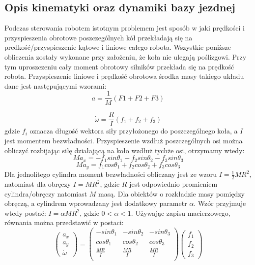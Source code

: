 \subsection{Opis kinematyki oraz dynamiki bazy jezdnej}
Podczas sterowania robotem istotnym problemem jest sposób w jaki prędkości i przyspieszenia obrotowe poszczególnych kół przekładają się
na predkość/przyspieszenie kątowe i liniowe całego robota. Wszystkie poniższe obliczenia zostały wykonane przy założeniu, że koła nie ulegają poślizgowi.
Przy tym uproszczeniu cały moment obrotowy silników przekłada się na prędkość robota.
Przyspieszenie liniowe i prędkość obrotowa środka masy takiego układu dane jest następującymi wzorami:
\begin{equation}
a=\frac{1}{M}(F1+F2+F3)
\end{equation}

\begin{equation}
\dot{ \omega }=\frac{R}{I}(f_1+f_2+f_3)
\end{equation}
gdzie $f_i$ oznacza długość wektora siły przyłożonego do poszczególnego koła, a $I$  jest momentem bezwładności.
Przyspieszenie wzdłuż poszczególnych osi można obliczyć rozbijając siłę działającą na koło wzdłuż tychże osi, otrzymamy wtedy:
\begin{equation}
Ma_x=-f_1sin\theta_1 - f_2sin\theta_2 - f_3sin\theta_3
\end{equation}
\begin{equation}
Ma_y=f_1cos\theta_1 + f_2cos\theta_2 + f_3cos\theta_3
\end{equation}
Dla jednolitego cylindra moment bezwładności obliczany jest ze wzoru $I=\frac{1}{2}MR^2$, natomiast dla obręczy $I=MR^2$, gdzie $R$ jest odpowiednio promieniem
\mbox{cylindra/obręczy} natomiast $M$ masą. Dla obiektów o rozkładzie masy pomiędzy
obręczą, a cylindrem wprowadzany jest dodatkowy parametr $\alpha$. Wzór przyjmuje wtedy postać: $I=\alpha MR^2$, gdzie $0<\alpha<1$.
Używając zapisu macierzowego, równania można przedstawić w postaci:
\begin{equation}
 \begin{pmatrix}
  a_x\\
  a_y\\
  \dot{\omega}
 \end{pmatrix}
  =
\begin{pmatrix}
  -sin\theta_1 & -sin\theta_2 & -sin\theta_3 \\
  cos\theta_1 & cos\theta_2 & cos\theta_3 \\
  \frac{MR}{I} & \frac{MR}{I} & \frac{MR}{I}\\
 \end{pmatrix} 
 \begin{pmatrix}
  f_1\\
  f_2\\
  f_3
 \end{pmatrix}
\end{equation}

